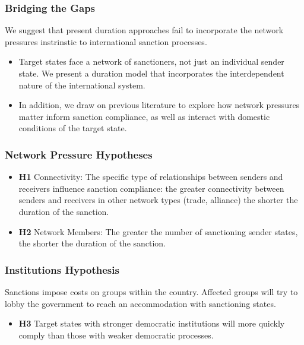 \documentclass{beamer}
\begin{document}
\begin{frame}
\frametitle{Bridging the Gaps}
We suggest that present duration approaches fail to incorporate the network pressures instrinstic to international sanction processes. 

\begin{itemize}
\item Target states face a network of sanctioners, not just an individual sender state. We present a duration model that incorporates the interdependent nature of the international system. 
\item In addition, we draw on previous literature to explore how network pressures matter inform sanction compliance, as well as interact with domestic conditions of the target state. 
\end{itemize}
\end{frame}



\begin{frame}
\frametitle{Network Pressure Hypotheses}
\begin{itemize}
		\item \textbf{H1} Connectivity: The specific type of relationships between senders and receivers influence sanction compliance: the greater connectivity between senders and receivers in other network types (trade, alliance) the shorter the duration of the sanction. 
		\item \textbf{H2} Network Members: The greater the number of sanctioning sender states, the shorter the duration of the sanction. 
\end{itemize} 
\end{frame}

\begin{frame}
\frametitle{Institutions Hypothesis}
	Sanctions impose costs on groups within the country.  Affected groups will try to lobby the government to reach an accommodation with sanctioning states. 
	\begin{itemize}
	\item \textbf{H3} Target states with stronger democratic institutions will more quickly comply than those with weaker democratic processes. 
\end{itemize}
\end{frame}
\end{document}
